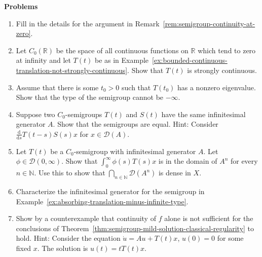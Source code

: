 \textbf{Problems}

\begin{enumerate}[label=\thesection.\arabic*.,ref=\thesection.\arabic*,start=2,series=book-problems]

\item\label{ex:semigroup-continuity-at-zero-details} Fill in the details for the argument in Remark~\ref{rem:semigroup-continuity-at-zero}.

\item\label{ex:translation-semigroup-on-vanishing-continuous-functions} Let $C_0(\mathbb{R})$ be the space of all continuous functions on $\mathbb{R}$ which tend to zero at infinity and let $T(t)$ be as in Example~\ref{ex:bounded-continuous-translation-not-strongly-continuous}. Show that $T(t)$ is strongly continuous.

\item\label{ex:semigroup-nonzero-eigenvalue-finite-type} Assume that there is some $t_0>0$ such that $T(t_0)$ has a nonzero eigenvalue. Show that the type of the semigroup cannot be $-\infty$.

\item\label{ex:semigroup-generator-determines-semigroup} Suppose two $C_0$-semigroups $T(t)$ and $S(t)$ have the same infinitesimal generator $A$. Show that the semigroups are equal. Hint: Consider $\frac{\mathrm{d}}{\mathrm{d}s}T(t-s)S(s)x$ for $x\in\mathcal{D}(A)$.

\item\label{ex:semigroup-smooth-integrated-orbits-dense-powers-domain} Let $T(t)$ be a $C_0$-semigroup with infinitesimal generator $A$. Let $\phi\in\mathcal{D}(0,\infty)$. Show that $\int_0^\infty\phi(s)T(s)x$ is in the domain of $A^n$ for every $n\in\mathbb{N}$. Use this to show that $\bigcap_{n\in\mathbb{N}}\mathcal{D}(A^n)$ is dense in $X$.

\item\label{ex:absorbing-translation-generator-characterization} Characterize the infinitesimal generator for the semigroup in Example~\ref{ex:absorbing-translation-minus-infinite-type}.

\item\label{ex:continuous-forcing-insufficient-classical-solution} Show by a counterexample that continuity of $f$ alone is not sufficient for the conclusions of Theorem~\ref{thm:semigroup-mild-solution-classical-regularity} to hold. Hint: Consider the equation $\dot u=Au+T(t)x$, $u(0)=0$ for some fixed $x$. The solution is $u(t)=tT(t)x$.

\end{enumerate}

